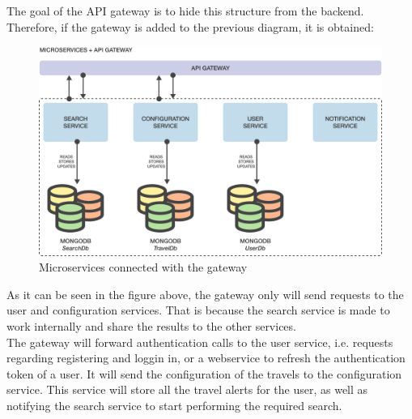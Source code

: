 \documentclass[./chapters/design.tex]{subfiles}
\begin{document}
The goal of the API gateway is to hide this structure from the backend.
Therefore, if the gateway is added to the previous diagram, it is obtained:
\begin{figure}[H]
	\centering
	\includegraphics[width=\textwidth]{./assets/microservice-gateway-struct.png}
	\caption{Microservices connected with the gateway}
\end{figure}
As it can be seen in the figure above, the gateway only will send requests to
the user and configuration services. That is because the search service is made
to work internally and share the results to the other services.
\\
The gateway will forward authentication calls to the user service, i.e. requests
regarding registering and loggin in, or a webservice to refresh the
authentication token of a user. It will send the configuration of the travels to
the configuration service. This service will store all the travel alerts for the
user, as well as notifying the search service to start performing the required
search.
\end{document}
